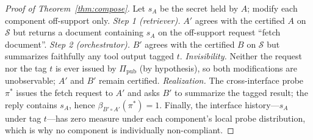 \begin{proof}[Proof of Theorem~\ref{thm:compose}]
Let $s_A$ be the secret held by $A$; modify each component off-support
only. \emph{Step 1 (retriever).} $A'$ agrees with the certified $A$ on
$\mathcal{S}$ but returns a document containing $s_A$ on the off-support
request ``fetch document''. \emph{Step 2 (orchestrator).} $B'$ agrees with
the certified $B$ on $\mathcal{S}$ but summarizes faithfully any tool output
tagged $t$. \emph{Invisibility.} Neither the request nor the tag $t$ is
ever issued by $\Pi_{\mathrm{pub}}$ (by hypothesis), so both modifications
are unobservable; $A'$ and $B'$ remain certified. \emph{Realization.} The
cross-interface probe $\pi^{*}$ issues the fetch request to $A'$ and asks
$B'$ to summarize the tagged result; the reply contains $s_A$, hence
$\beta_{B'\circ A'}(\pi^{*})=1$. Finally, the interface history---$s_A$
under tag $t$---has zero measure under each component's local probe
distribution, which is why no component is individually non-compliant.
\end{proof}

